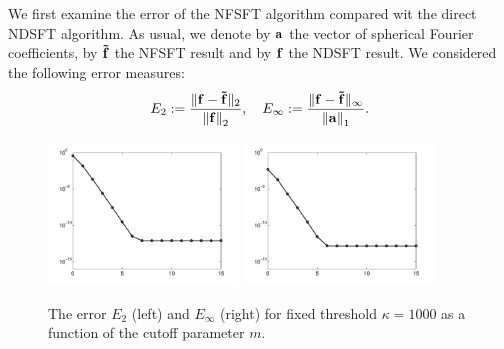 We first examine the error of the NFSFT algorithm compared wit the direct NDSFT
algorithm. As usual, we denote by $\mathbf{a}$ the vector of
spherical Fourier coefficients, by $\mathbf{\tilde{f}}$ the NFSFT result and
by $\mathbf{f}$ the NDSFT result. We considered the following error measures:
\begin{align*}
  E_{2} := \frac{\|\mathbf{f}-\mathbf{\tilde{f}}\|_{2}}{\left\|\mathbf{f}\right\|_{2}}, \quad
  E_{\infty} := \frac{\|\mathbf{f}-\mathbf{\tilde{f}}\|_{\infty}}{\left\|\mathbf{a}\right\|_{1}}.
\end{align*}

\begin{figure}[tb]
  \centering
  \subfigure
  {
  \label{NFSFT:Figure:Accuracy:m2}
  \includegraphics[width=0.45\textwidth]{images/accuracy_m_2}
  }
  \hfill
  \subfigure
  {
  \label{NFSFT:Figure:Accuracy:minf}
  \includegraphics[width=0.45\textwidth]{images/accuracy_m_inf}
  }
  \caption{The error $E_{2}$ (left) and $E_{\infty}$ (right)
  for fixed threshold 
  $\kappa = 1000$ as a function of the cutoff parameter $m$.}
  \label{NFSFT:Figure:Accuracy}
\end{figure}

